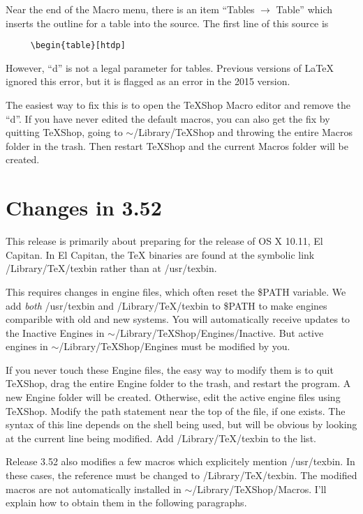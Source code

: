 \documentclass[11pt, oneside]{amsart}
\begin{document}
Near the end of the Macro menu, there is an item ``Tables $\rightarrow$ Table'' which inserts the
outline for a table into the source. The first line of this source is 
\begin{verbatim}
     \begin{table}[htdp]
\end{verbatim}

However, ``d'' is not a legal parameter for tables. Previous versions of LaTeX ignored this error, but it is flagged as an error in the 2015 version. 

The easiest way to fix this is to open the TeXShop Macro editor and remove the ``d''. If you have never edited the default macros,
you can also get the fix by quitting TeXShop, going to $\sim$/Library/TeXShop and
throwing the entire Macros folder in the trash. Then restart TeXShop and the current
Macros folder will be created.


\section{Changes in 3.52}


This release is primarily about preparing for the release of OS X 10.11, El Capitan. In El Capitan, the TeX binaries are found at the symbolic link /Library/TeX/texbin rather than at /usr/texbin.

This requires changes in engine files, which often reset the \$PATH variable. We add {\em both}
/usr/texbin and /Library/TeX/texbin to \$PATH to make engines comparible with old and new systems. You will automatically receive updates to the Inactive Engines in $\sim$/Library/TeXShop/Engines/Inactive. But active engines in $\sim$/Library/TeXShop/Engines must be modified
by you.

If you never touch these Engine files, the easy way to modify them is to quit TeXShop, drag the entire Engine folder to the trash, and restart the program. A new Engine folder will be created. Otherwise,  edit the active engine files using TeXShop. Modify the path statement near the top of the file, if one exists. The syntax of this line depends on the shell being used, but will be obvious by looking at the current line being modified. Add /Library/TeX/texbin to the list.

Release 3.52 also modifies a few macros which explicitely mention /usr/texbin. In these cases, the reference must be changed to /Library/TeX/texbin. The modified macros are not automatically
installed in $\sim$/Library/TeXShop/Macros.  I'll explain  how to obtain them in the
following paragraphs.
\end{document}
